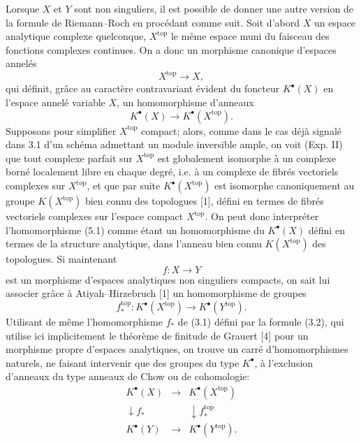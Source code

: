 \documentclass[11pt]{article}
\begin{document}
Lorsque $X$ et $Y$ sont non singuliers, il est possible de donner une autre version de la formule de Riemann--Roch en proc\'edant comme suit. Soit d'abord $X$ un espace analytique complexe quelconque, $X^{\mathrm{top}}$ le m\^eme espace muni du faisceau des fonctions complexes continues. On a donc un morphisme canonique d'espaces annel\'es
\[
X^{\mathrm{top}}\longrightarrow X,
\]
qui d\'efinit, gr\^ace au caract\`ere contravariant \'evident du foncteur $K^\bullet(X)$ en l'espace annel\'e variable $X$, un homomorphisme d'anneaux
\begin{equation}\tag{5.1}
K^\bullet(X)\longrightarrow K^\bullet(X^{\mathrm{top}}).
\end{equation}
Supposons pour simplifier $X^{\mathrm{top}}$ compact; alors, comme dans le cas d\'ej\`a signal\'e dans 3.1 d'un sch\'ema admettant un module inversible ample, on voit (Exp. II) que tout complexe parfait sur $X^{\mathrm{top}}$ est globalement isomorphe \`a un complexe born\'e localement libre en chaque degr\'e, i.e. \`a un complexe de fibr\'es vectoriels complexes sur $X^{\mathrm{top}}$, et que par suite $K^\bullet(X^{\mathrm{top}})$ est isomorphe canoniquement au groupe $K(X^{\mathrm{top}})$ bien connu des topologues [1], d\'efini en termes de fibr\'es vectoriels complexes sur l'espace compact $X^{\mathrm{top}}$. On peut donc interpr\'eter l'homomorphisme (5.1) comme \'etant un homomorphisme du $K^\bullet(X)$ d\'efini en termes de la structure analytique, dans l'anneau bien connu $K(X^{\mathrm{top}})$ des topologues. Si maintenant
\[
f:X\longrightarrow Y
\]
est un morphisme d'espaces analytiques non singuliers compacts, on sait lui associer gr\^ace \`a Atiyah--Hirzebruch [1] un homomorphisme de groupes
\begin{equation}\tag{5.2}
f^{\mathrm{top}}_*:K^\bullet(X^{\mathrm{top}})\longrightarrow K^\bullet(Y^{\mathrm{top}}).
\end{equation}
Utilisant de m\^eme l'homomorphisme $f_*$ de (3.1) d\'efini par la formule (3.2), qui utilise ici implicitement le th\'eor\`eme de finitude de Grauert [4] pour un morphisme propre d'espaces analytiques, on trouve un carr\'e d'homomorphismes naturels, ne faisant intervenir que des groupes du type $K^\bullet$, \`a l'exclusion d'anneaux du type anneaux de Chow ou de cohomologie:
\begin{equation}\tag{5.3}
\begin{array}{ccc}
K^\bullet(X) & \longrightarrow & K^\bullet(X^{\mathrm{top}}) \\
\downarrow f_* && \downarrow f^{\mathrm{top}}_* \\
K^\bullet(Y) & \longrightarrow & K^\bullet(Y^{\mathrm{top}}).
\end{array}
\end{equation}
\end{document}
